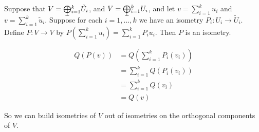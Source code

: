 \begin{lemma}
    Suppose that $V = \bigorthoplus_{i=1}^k \tilde{U}_i$, and $V = \bigorthoplus_{i=1}^k U_i$, and let $v = \sum_{i=1}^k u_i$ and $v = \sum_{i=1}^k\tilde{u}_i$. Suppose for each $i=1,...,k$ we have an isometry $P_i : U_i \to \tilde{U}_i$. Define $P : V \to V$ by $P(\sum_{i=1}^k u_i) = \sum_{i=1}^k P_i u_i$. Then $P$ is an isometry.\label{lemma74}
\end{lemma}
\begin{remark*}
     \begin{align*}Q(P(v)) &= Q(\sum_{i=1}^k P_i(v_i)) \\&= \sum_{i=1}^k Q(P_i(v_i)) \\&= \sum_{i=1}^k Q(v_i) \\&= Q(v)\end{align*}
\end{remark*}
So we can build isometries of $V$ out of isometries on the orthogonal components of $V$.
